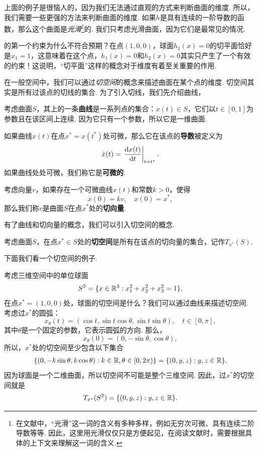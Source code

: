 上面的例子是很恼人的，因为我们无法通过直观的方式来判断曲面的维度. 所以，我们需要一些更强的方法来判断曲面的维度. 如果$h$是具有连续的一阶导数的函数，那么这个曲面是\emph{光滑}\footnote{在文献中，“光滑”这一词的含义有多种多样，例如无穷次可微、具有连续二阶导数等等. 因此，这里用光滑仅仅只是方便起见，在阅读文献时，需要根据具体的上下文来理解这一词的含义.}的. 我们只考虑光滑曲面，因为它们是最常见的情况.

 的第一个约束为什么不符合预期？在点$(1,0,0)$，球面$h_1(x)=0$的切平面恰好是$x_1=1$，这意味着在这个点，$h_1(x)=0$和$h_2(x)=0$其实只产生了一个有效的约束！这说明，“切平面”这样的概念对于维度有着至关重要的作用. 
    
在一般空间中，我们可以通过\emph{切空间}的概念来描述曲面在某个点的维度. 切空间其实是所有过该点的切线的集合. 为了引入切线，我们先介绍曲线，
\begin{definition}[曲线和切向量]
    考虑曲面$S$，其上的一条\textbf{曲线}是一系列点的集合：$x(t)\in S$，它们以$t\in[0,1]$为参数且在该区间上连续. 因为它只有一个参数，所以它是一维曲面. 

    如果曲线$x(t)$在点$x^*=x(t^*)$处可微，那么它在该点的\textbf{导数}被定义为
    \[\dot{x}(t)=\left.\frac{\mathrm{d} x(t)}{\mathrm{d} t}\right|_{t=t^*}.\]
    如果曲线处处可微，我们称它是\textbf{可微的}. 

    考虑向量$v$，如果存在一个可微曲线$x(t)$和常数$k>0$，使得
    \[\dot{x}(0)=kv,\quad x(0)=x^*,\]
    那么我们称$v$是曲面$S$在点$x^*$处的\textbf{切向量}.
\end{definition}

有了曲线和切向量的概念，我们可以引入切空间的概念. 

\begin{definition}[切空间]
    考虑曲面$S$，在点$x^*\in S$处的\textbf{切空间}是所有在该点的切向量的集合，记作$T_{x^*}(S)$.
\end{definition}

下面我们看一个切空间的例子.

\begin{example}[三维球面的切空间]\label{ex:tan-space}
    考虑三维空间中的单位球面
    \[S^2=\{x\in\mathbb{R}^3:x_1^2+x_2^2+x_3^2=1\}.\]
    在点$x^*=(1,0,0)$处，球面的切空间是什么？我们可以通过曲线来描述切空间. 考虑过$x^*$的圆弧：
    \[x_\theta(t)=(\cos t,\sin t\cos\theta,\sin t\sin\theta), \quad t\in[0,\pi],\]
    其中$\theta$是一个固定的参数，它表示圆弧的方向. 那么，
    \[\dot{x}_\theta(0)=(0,-\sin\theta,\cos\theta),\]
    所以，$x^*$处的切空间至少包含以下集合
    \begin{align*}
        \{(0,-k\sin \theta,k\cos\theta):k\in\mathbb{R},\theta\in[0,2\pi)\}= \{(0,y,z):y,z\in\mathbb{R}\}.
    \end{align*}
    因为球面是一个二维曲面，所以切空间不可能是整个三维空间. 因此，过$x^*$的切空间就是
    \[T_{x^*}(S^2)=\{(0,y,z):y,z\in\mathbb{R}\}.\]
\end{example}

